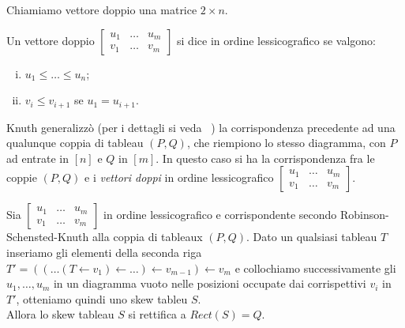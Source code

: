\begin{notaz}
Chiamiamo vettore doppio una matrice $2 \times n$. 
\end{notaz}

\begin{defn}
Un vettore doppio
\begin{math}
\begin{bmatrix}
u_1 & \ldots & u_m\\
v_1 & \ldots & v_m
\end{bmatrix}
\end{math}
si dice in ordine lessicografico se valgono:
\begin{enumerate}[(i)]
\item $u_1 \leq \ldots \leq u_n$;
\item $v_i \leq v_{i+1}$ se $u_1 = u_{i+1}$.
\end{enumerate}
\end{defn}

Knuth generalizz\`o (per i dettagli si veda ~\cite{fulton1997young})
la corrispondenza precedente ad una qualunque coppia di
tableau $(P,Q)$, che riempiono lo stesso diagramma, con $P$ ad entrate
in $[n]$ e $Q$ in $[m]$. In questo caso si ha la corrispondenza fra le
coppie $(P,Q)$ e i \emph{vettori doppi} in ordine lessicografico
\begin{math}
\begin{bmatrix}
u_1 & \ldots & u_m\\
v_1 & \ldots & v_m
\end{bmatrix}
\end{math}.

\begin{prop}
Sia
\begin{math}
\begin{bmatrix}
u_1 & \ldots & u_m\\
v_1 & \ldots & v_m
\end{bmatrix}
\end{math}
in ordine lessicografico e corrispondente secondo
Robinson-Schensted-Knuth alla coppia di tableaux $(P,Q)$. Dato un
qualsiasi tableau $T$ inseriamo gli elementi della seconda riga
$T' = ((\ldots (T \gets v_1) \gets \ldots ) \gets v_{m-1} ) \gets v_m$ e
collochiamo successivamente gli $u_1, \ldots, u_m$ in un diagramma
vuoto nelle posizioni occupate dai corrispettivi $v_i$ in $T'$,
otteniamo quindi uno skew tableu $S$.\\
Allora lo skew tableau $S$ si rettifica a $Rect(S)=Q$.
\end{prop}

